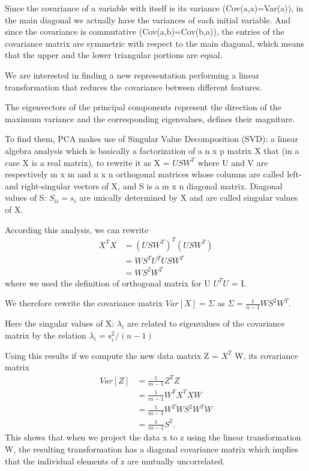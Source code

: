 \documentclass[a4paper,11pt]{article}
\begin{document}
Since the covariance of a variable with itself is its variance (Cov(a,a)=Var(a)), in the main diagonal we actually have the variances of each initial variable. And since the covariance is commutative (Cov(a,b)=Cov(b,a)), the entries of the covariance matrix are symmetric with respect to the main diagonal, which means that the upper and the lower triangular portions are equal.

We are interested in finding a new representation performing a linear transformation that reduces the covariance between different features.

The eigenvectors of the principal components represent the direction of the maximum variance
and the corresponding eigenvalues, defines their magniture.


To find them, PCA makes use of Singular Value Decomposition (SVD): a linear algebra analysis which is basically a factorization of a n x p matrix X that (in a case X is a real matrix), to rewrite it as X = $U S W^T$ where U and V are respectively m x m  and n x n orthogonal matrices whose columns are called left- and right-singular vectors of X, and S is a  m x n diagonal matrix.
Diagonal values of S: $S_{ii} = s_i$ are unically determined by X and are called singular values of X.

According this analysis, we can rewrite
\begin{equation}
\begin{aligned}
X^T X & = (U S W^T)^T(U S W^T) \\
& = W S^T U^T U S W^T \\
& = W S^2 W^T
\end{aligned}
\end{equation}
where we used the definition of orthogonal matrix for U $U^T U$ = I.

We therefore rewrite the covariance matrix $Var[X] = \Sigma$ as $\Sigma = \frac{1}{n-1}W S^2 W^T$.

Here the singular values of X: $\lambda_i$ are related to eigenvalues of the covariance matrix by the relation $\lambda_i = s_i^2/(n-1)$

Using this results if we compute the new data matrix Z = $X^T$ W, its covariance matrix
\begin{equation}
\begin{aligned}
Var[Z] & = \frac{1}{m-1}Z^T Z \\
 & =\frac{1}{m-1} W^T X^T X W   \\
 & = \frac{1}{m-1} W^T W S^2 W^T W \\
 & = \frac{1}{m-1}S^2 .
\end{aligned}
\end{equation}
This shows that when we project the data x to z using the linear transformation W, the resulting transformation has a diagonal covariance matrix which implies that the individual elements of z are mutually uncorrelated.
\end{document}
